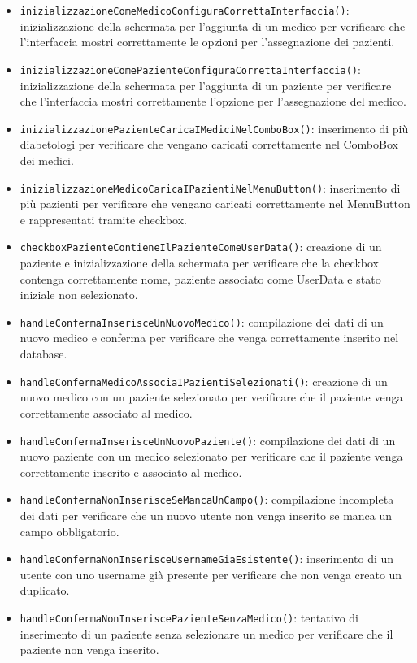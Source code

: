 \begin{itemize}
	
	\item \texttt{inizializzazioneComeMedicoConfiguraCorrettaInterfaccia()}: inizializzazione della schermata per l'aggiunta di un medico per verificare che l'interfaccia mostri correttamente le opzioni per l'assegnazione dei pazienti.
	
	\item \texttt{inizializzazioneComePazienteConfiguraCorrettaInterfaccia()}: inizializzazione della schermata per l'aggiunta di un paziente per verificare che l'interfaccia mostri correttamente l'opzione per l'assegnazione del medico.
	
	\item \texttt{inizializzazionePazienteCaricaIMediciNelComboBox()}: inserimento di più diabetologi per verificare che vengano caricati correttamente nel ComboBox dei medici.
	
	\item \texttt{inizializzazioneMedicoCaricaIPazientiNelMenuButton()}: inserimento di più pazienti per verificare che vengano caricati correttamente nel MenuButton e rappresentati tramite checkbox.
	
	\item \texttt{checkboxPazienteContieneIlPazienteComeUserData()}: creazione di un paziente e inizializzazione della schermata per verificare che la checkbox contenga correttamente nome, paziente associato come UserData e stato iniziale non selezionato.
	
	\item \texttt{handleConfermaInserisceUnNuovoMedico()}: compilazione dei dati di un nuovo medico e conferma per verificare che venga correttamente inserito nel database.
	
	\item \texttt{handleConfermaMedicoAssociaIPazientiSelezionati()}: creazione di un nuovo medico con un paziente selezionato per verificare che il paziente venga correttamente associato al medico.
	
	\item \texttt{handleConfermaInserisceUnNuovoPaziente()}: compilazione dei dati di un nuovo paziente con un medico selezionato per verificare che il paziente venga correttamente inserito e associato al medico.
	
	\item \texttt{handleConfermaNonInserisceSeMancaUnCampo()}: compilazione incompleta dei dati per verificare che un nuovo utente non venga inserito se manca un campo obbligatorio.
	
	\item \texttt{handleConfermaNonInserisceUsernameGiaEsistente()}: inserimento di un utente con uno username già presente per verificare che non venga creato un duplicato.
	
	\item \texttt{handleConfermaNonInseriscePazienteSenzaMedico()}: tentativo di inserimento di un paziente senza selezionare un medico per verificare che il paziente non venga inserito.
	
\end{itemize}